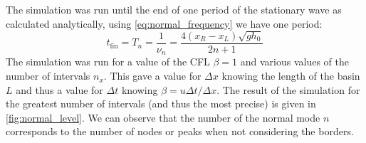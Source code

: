 The simulation was run until the end of one period of the stationary wave as calculated analytically, using \autoref{eq:normal_frequency} we have one period:
\begin{equation}
    t_\mathrm{fin} = T_n = \frac{1}{\nu_n} = \frac{4(x_R - x_L)\sqrt{gh_0}}{2n + 1}
\end{equation}
The simulation was run for a value of the CFL $\beta = 1$ and various values of the number of intervals $n_x$. This gave a value for $\Delta x$ knowing the length of the basin $L$ and thus a value for $\Delta t$ knowing $\beta = u\Delta t/\Delta x$. The result of the simulation for the greatest number of intervals (and thus the most precise) is given in \autoref{fig:normal_level}. We can observe that the number of the normal mode $n$ corresponds to the number of nodes or peaks when not considering the borders.

